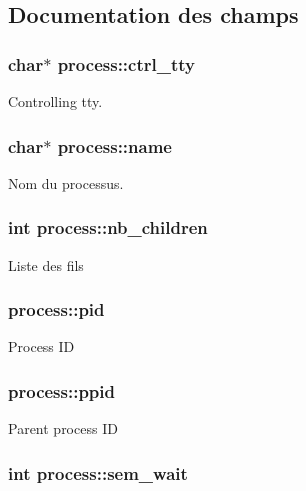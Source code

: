 \subsection{Documentation des champs}
\hypertarget{structprocess_ac44ae9d0fbc98179b8f89bf666580086}{
\subsubsection[{ctrl\+\_\+tty}]{\setlength{\rightskip}{0pt plus 5cm}char$\ast$ process\+::ctrl\+\_\+tty}}\label{structprocess_ac44ae9d0fbc98179b8f89bf666580086}
Controlling tty. \hypertarget{structprocess_ab00affa63607d02095f147da6f1c0983}{
\subsubsection[{name}]{\setlength{\rightskip}{0pt plus 5cm}char$\ast$ process\+::name}}\label{structprocess_ab00affa63607d02095f147da6f1c0983}
Nom du processus. \hypertarget{structprocess_a3c7e75af24b759fca4705883fd3bc68a}{
\subsubsection[{nb\+\_\+children}]{\setlength{\rightskip}{0pt plus 5cm}int process\+::nb\+\_\+children}}\label{structprocess_a3c7e75af24b759fca4705883fd3bc68a}
Liste des fils \hypertarget{structprocess_a5f455d8121a78f8050bf669326fbe731}{
\subsubsection[{pid}]{ process\+::pid}}\label{structprocess_a5f455d8121a78f8050bf669326fbe731}
Process I\+D \hypertarget{structprocess_a75c12130e8e78afe9d8fc94a6f59f9ba}{
\subsubsection[{ppid}]{ process\+::ppid}}\label{structprocess_a75c12130e8e78afe9d8fc94a6f59f9ba}
Parent process I\+D \hypertarget{structprocess_ac41b1192ed3707ececd1b3d5a8030e07}{
\subsubsection[{sem\+\_\+wait}]{\setlength{\rightskip}{0pt plus 5cm}int process\+::sem\+\_\+wait}}\label{structprocess_ac41b1192ed3707ececd1b3d5a8030e07}
